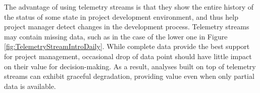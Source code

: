 The advantage of using telemetry streams is that they show the entire history of the status of some state in project development environment, and thus help project manager detect changes in the development process. Telemetry streams may contain missing data, such as in the case of the lower one in Figure \ref{fig:TelemetryStreamIntroDaily}. While complete data provide the best support for project management, occasional drop of data point should have little impact on their value for decision-making. As a result, analyses built on top of telemetry streams can exhibit graceful degradation, providing value even when only partial data is available.


%
%
%
%


